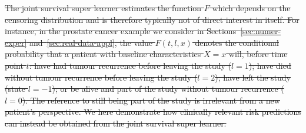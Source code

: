 \documentclass[lineno]{biometrika}
\newcommand{\1}{\mathds{1}}
\providecommand{\DIFdel}[1]{{\protect\color{red}\sout{#1}}}                      %
\providecommand{\DIFdelend}{} %
\begin{document}
\DIFdel{The joint survival super learner estimates the function \( F \) which
depends on the censoring distribution and is therefore typically not
of direct interest in itself. For instance, in the prostate cancer
example we consider in Sections~\ref{sec:numer-exper}
and~\ref{sec:real-data-appl}, the value \( F(t, l, x) \) denotes the
conditional probability that a patient with baseline characteristics
\( X=x \) will, before time point \( t \):
have had tumour recurrence
before leaving the study ($l=1$); have died without tumour recurrence
before leaving the study ($l=2$); have left the study (state $l=-1$);
or be alive and part of the study without tumour recurrence ($l=0$).
The reference to still being part of the study is irrelevant from a
new patient's perspective. We here demonstrate how clinically relevant
risk predictions can instead be obtained from the joint survival super
learner.
}\DIFdelend %
\end{document}
